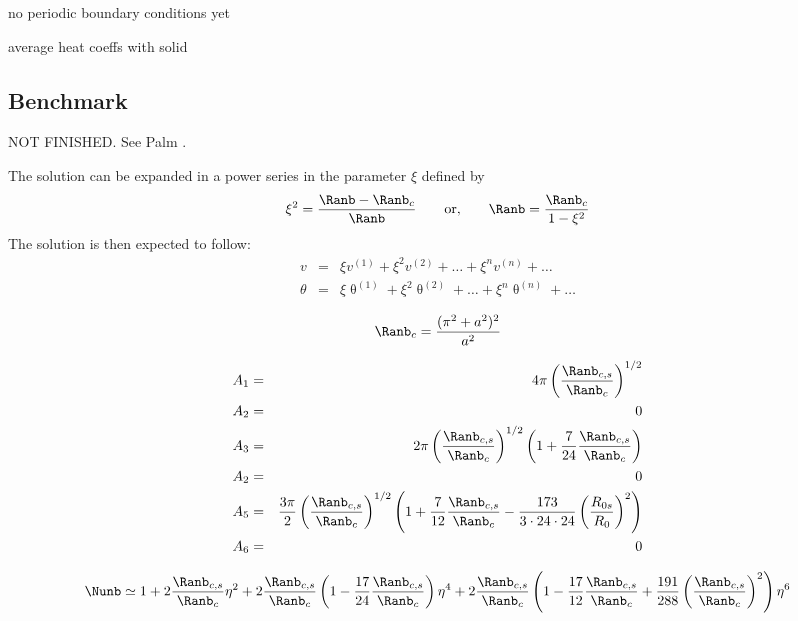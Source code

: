 \vspace{1cm}

no periodic boundary conditions yet

average heat coeffs with solid

\subsection*{Benchmark}

NOT FINISHED. See Palm . 

The solution can be expanded in a power series in the parameter $\xi$ defined by 
\[
\xi^2 = \frac{\Ranb-\Ranb_c}{\Ranb}
\qquad
\text{or,}\qquad
\Ranb = \frac{\Ranb_c}{1-\xi^2}
\]
The solution is then expected to follow:
\begin{eqnarray}
v &=& \xi v^{(1)} + \xi^2 v^{(2)} + \dots + \xi^n v^{(n)} + \dots \\
\theta &=& \xi \uptheta^{(1)} + \xi^2 \uptheta^{(2)} + \dots + \xi^n \uptheta^{(n)} + \dots 
\end{eqnarray}


\[
\Ranb_c = \frac{(\pi^2+a^2)^2}{a^2}
\]

\begin{eqnarray}
A_1&=&4\pi \left( \frac{\Ranb_{c,s}}{\Ranb_c} \right)^{1/2} \nonumber\\
A_2 &=& 0 \nonumber\\
A_3&=&2\pi \left(\frac{\Ranb_{c,s}}{\Ranb_c} \right)^{1/2} \left(1 + \frac{7}{24} \frac{\Ranb_{c,s}}{\Ranb_c}   \right) \nonumber\\
A_2 &=& 0 \nonumber\\
A_5&=&\frac{3\pi}{2} \left(\frac{\Ranb_{c,s}}{\Ranb_c} \right)^{1/2}
\left(1+\frac{7}{12} \frac{\Ranb_{c,s}}{\Ranb_c} -
\frac{173}{3\cdot24\cdot24} \left(\frac{R_{0s}}{R_0}\right) ^2 
\right) \nonumber\\
A_6 &=& 0 \nonumber
\end{eqnarray}


\[
\Nunb
\simeq 1 + 2 \frac{\Ranb_{c,s}}{\Ranb_c} \eta^2
+ 2 \frac{\Ranb_{c,s}}{\Ranb_c}
\left( 1 -\frac{17}{24}\frac{\Ranb_{c,s}}{\Ranb_c} \right) \eta^4
+2 \frac{\Ranb_{c,s}}{\Ranb_c}
\left( 
1 -\frac{17}{12}\frac{\Ranb_{c,s}}{\Ranb_c}
+ \frac{191}{288} \left(\frac{\Ranb_{c,s}}{\Ranb_c}\right) ^2
\right) \eta^6 
\]



